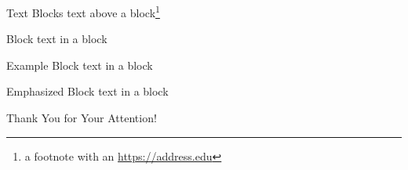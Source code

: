 \documentclass[aspectratio=169]{beamer}
\begin{document}
\begin{frame}{Text Blocks}
text above a block\footnote{a footnote with an \url{https://address.edu}}
\begin{block}{Block}
  text in a block
\end{block}
\begin{exampleblock}{Example Block}
  text in a block
\end{exampleblock}
\begin{alertblock}{Emphasized Block}
  text in a block
\end{alertblock}
\end{frame}


\begin{frame}[plain]
\vfill
\centerline{Thank You for Your Attention!}
\vfill\vfill
\end{frame}
\end{document}
